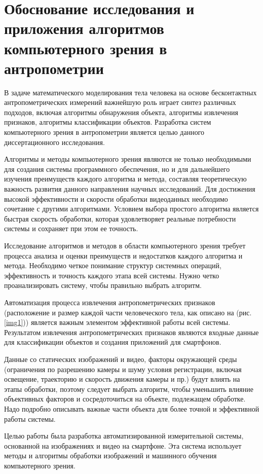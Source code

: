 \section{Обоснование исследования и приложения алгоритмов компьютерного зрения в антропометрии}

В задаче математического моделирования тела человека на основе бесконтактных антропометрических измерений важнейшую роль играет синтез различных подходов, включая алгоритмы обнаружения объекта, алгоритмы извлечения признаков, алгоритмы классификации объектов. Разработка систем компьютерного зрения в антропометрии является целью данного диссертационного исследования.


Алгоритмы и методы компьютерного зрения являются не только необходимыми для создания системы программного обеспечения, но и для дальнейшего изучения преимуществ каждого алгоритма и метода, составляя теоретическую важность развития данного направления научных исследований. Для достижения высокой эффективности и скорости обработки видеоданных необходимо сочетание с другими алгоритмами. Условием выбора простого алгоритма является быстрая скорость обработки, которая удовлетворяет реальные потребности системы и сохраняет при этом ее точность.

Исследование алгоритмов и методов в области компьютерного зрения требует процесса анализа и оценки преимуществ и недостатков каждого алгоритма и метода. Необходимо четкое понимание структур системных операций, эффективность и точность каждого этапа всей системы. Нужно четко проанализировать систему, чтобы правильно выбрать алгоритм.

Автоматизация процесса извлечения антропометрических признаков (расположение и размер каждой части человеческого тела, как описано на (рис. \ref{img1})) является важным элементом эффективной работы всей системы. Результатом извлечения антропометрических признаков являются входные данные для классификации объектов и создания приложений для смартфонов.

Данные со статических изображений и видео, факторы окружающей среды (ограничения по разрешению камеры и шуму условия регистрации, включая освещение, траекторию и скорость движения камеры и пр.) будут влиять на этапы обработки, поэтому следует выбрать алгоритм, чтобы уменьшить влияние объективных факторов и сосредоточиться на объекте, подлежащем обработке. Надо подробно описывать важные части объекта для более точной и эффективной работы системы. 

Целью работы была разработка автоматизированной измерительной системы, основанной на изображениях и видео на смартфоне. Эта система использует методы и алгоритмы обработки изображений и машинного обучения компьютерного зрения.

